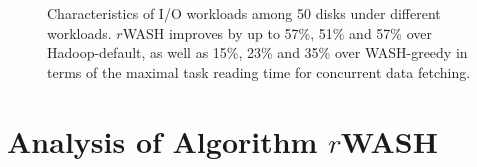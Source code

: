 \documentclass[conference]{IEEEtran}
\begin{document}
\begin{figure}[!t]
	\centering
	\quad\quad %
	\quad\quad
	\vspace{-1ex}
	\caption{Characteristics of I/O workloads among 50 disks under different workloads. $r$WASH improves by up to 57\%, 51\% and 57\% over Hadoop-default, as well as 15\%, 23\% and 35\% over WASH-greedy in terms of the maximal task reading time for concurrent data fetching.}
	\label{Fig:instance}
\end{figure}
\section{Analysis of Algorithm $r$WASH}\label{Analysis}
\end{document}
